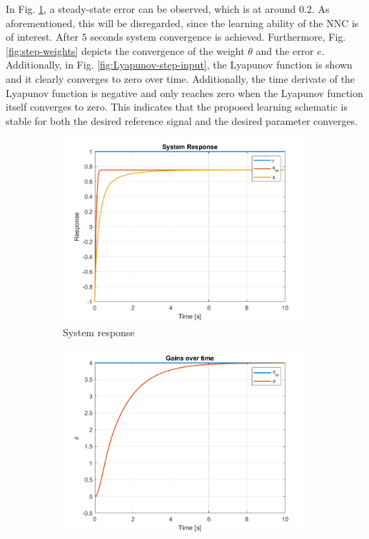 In Fig. \ref{fig:step}, a steady-state error can be observed, which is at around $0.2$. As aforementioned, this will be disregarded, since the learning ability of the NNC is of interest. After $5$ seconds system convergence is achieved. Furthermore, Fig. \ref{fig:step-weights} depicts the convergence of the weight $\theta$ and the error $e$. Additionally, in Fig. \ref{fig:Lyapunov-step-input}, the Lyapunov function is shown and it clearly converges to zero over time. Additionally, the time derivate of the Lyapunov function is negative and only reaches zero when the Lyapunov function itself converges to zero. This indicates that the proposed learning schematic is stable for both the desired reference signal and the desired parameter converges.

\begin{figure}[!t]
 \centering
 \begin{subfigure}[b]{0.49\linewidth}
  \centering
  \includegraphics[width=\linewidth]{images/NL-MRAC-SIM/Step/v2/NMRAC_First-Order_Response.png}
  \caption{System response}
  \label{fig:step}
 \end{subfigure}
 \hfill
 \begin{subfigure}[b]{0.49\linewidth}
  \centering
  \includegraphics[width=\linewidth]{images/NL-MRAC-SIM/Step/v2/NMRAC_First-Order_Parameters.png}

\end{subfigure}
\end{figure}
